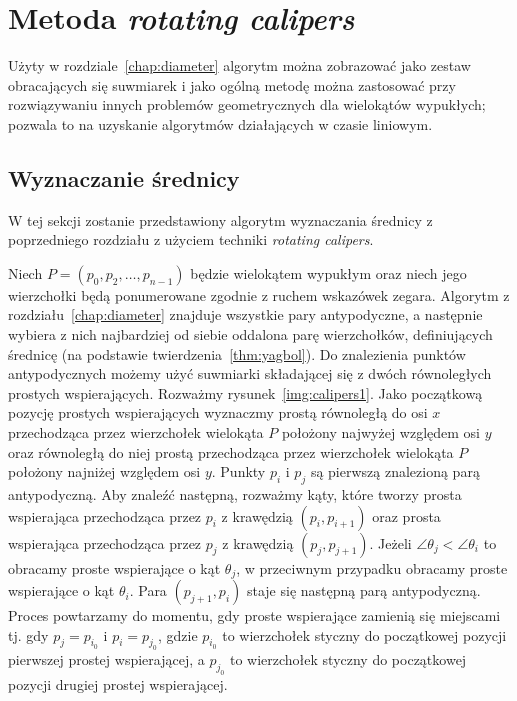 \chapter{Metoda \emph{rotating calipers}\label{chap:calipers}}
Użyty w rozdziale~\ref{chap:diameter} algorytm można zobrazować jako
zestaw obracających się suwmiarek i jako ogólną metodę można
zastosować przy rozwiązywaniu innych problemów geometrycznych dla
wielokątów wypukłych; pozwala to na uzyskanie algorytmów działających
w czasie liniowym.

\section{Wyznaczanie średnicy}
W tej sekcji zostanie przedstawiony algorytm wyznaczania średnicy z
poprzedniego rozdziału z użyciem techniki \emph{rotating calipers}.

Niech $P = (p_0, p_2, \ldots, p_{n-1})$ będzie wielokątem wypukłym
oraz niech jego wierzchołki będą ponumerowane zgodnie z ruchem
wskazówek zegara. Algorytm z rozdziału~\ref{chap:diameter} znajduje
wszystkie pary antypodyczne, a następnie wybiera z nich najbardziej od
siebie oddalona parę wierzchołków, definiujących średnicę (na
podstawie twierdzenia~\ref{thm:yagbol}). Do znalezienia punktów
antypodycznych możemy użyć suwmiarki składającej się z dwóch
równoległych prostych wspierających. Rozważmy
rysunek~\ref{img:calipers1}. Jako początkową pozycję prostych
wspierających wyznaczmy prostą równoległą do osi $x$ przechodząca
przez wierzchołek wielokąta $P$ położony najwyżej względem osi $y$
oraz równoległą do niej prostą przechodząca przez wierzchołek
wielokąta $P$ położony najniżej względem osi $y$. Punkty $p_i$ i $p_j$
są pierwszą znalezioną parą antypodyczną. Aby znaleźć następną,
rozważmy kąty, które tworzy prosta wspierająca przechodząca przez
$p_i$ z krawędzią $(p_i, p_{i+1})$ oraz prosta wspierająca
przechodząca przez $p_j$ z krawędzią $(p_j, p_{j+1})$.  Jeżeli
$\angle{\theta_j} < \angle{\theta_i}$ to obracamy proste wspierające o
kąt $\theta_j$, w przeciwnym przypadku obracamy proste wspierające o
kąt $\theta_i$. Para $(p_{j+1}, p_i)$ staje się następną parą
antypodyczną. Proces powtarzamy do momentu, gdy proste wspierające
zamienią się miejscami tj. gdy $p_j = p_{i_0}$ i $p_i = p_{j_0}$,
gdzie $p_{i_0}$ to wierzchołek styczny do początkowej pozycji
pierwszej prostej wspierającej, a $p_{j_0}$ to wierzchołek styczny do
początkowej pozycji drugiej prostej wspierającej.

